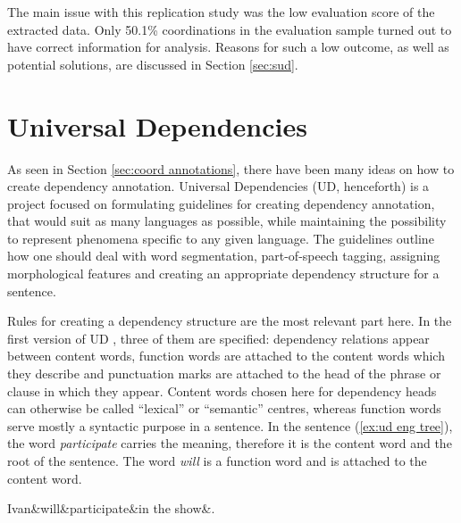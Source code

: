 The main issue with this replication study was the low evaluation score of the extracted data. Only 50.1\% coordinations in the evaluation sample turned out to have correct information for analysis. Reasons for such a low outcome, as well as potential solutions, are discussed in Section \ref{sec:sud}.

\section{Universal Dependencies}\label{sec:ud}

As seen in Section \ref{sec:coord annotations}, there have been many ideas on how to create dependency annotation. Universal Dependencies (UD, henceforth) is a project focused on formulating guidelines for creating dependency annotation, that would suit as many languages as possible, while maintaining the possibility to represent phenomena specific to any given language. The guidelines outline how one should deal with word segmentation, part-of-speech tagging, assigning morphological features and creating an appropriate dependency structure for a sentence. 

Rules for creating a dependency structure are the most relevant part here. In the first version of UD \citep{ud1}, three of them are specified: dependency relations appear between content words, function words are attached to the content words which they describe and punctuation marks are attached to the head of the phrase or clause in which they appear. Content words chosen here for dependency heads can otherwise be called ``lexical'' or ``semantic'' centres, whereas function words serve mostly a syntactic purpose in a sentence. In the sentence (\ref{ex:ud eng tree}), the word \textsl{participate} carries the meaning, therefore it is the content word and the root of the sentence. The word \textsl{will} is a function word and is attached to the content word.

\begin{exe}
    \ex
    \label{ex:ud eng tree}
    \begin{dependency}[theme = simple, baseline=-\the\dimexpr\fontdimen22\textfont2\relax]
        \begin{deptext}
            Ivan\&will\&participate\&in the show\&.\\
        \end{deptext}
    \end{dependency}
\end{exe}

